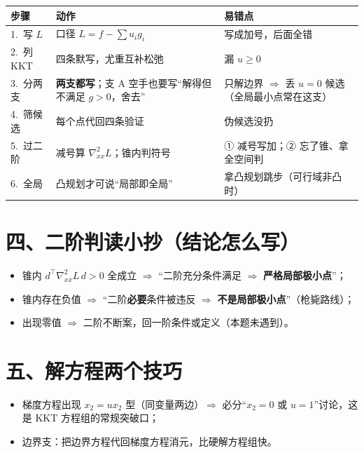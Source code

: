 \documentclass[11pt]{ctexart}
\begin{document}
\begin{center}\footnotesize
\begin{tabular}{p{2.6cm} p{6.4cm} p{6.6cm}}
\hline
\textbf{步骤} & \textbf{动作} & \textbf{易错点} \\
\hline
1.\ 写 $L$ & 口径 $L=f-\sum u_i g_i$ & 写成加号，后面全错 \\
2.\ 列 KKT & 四条默写，尤重互补松弛 & 漏 $u\ge0$ \\
3.\ 分两支 & \textbf{两支都写}；支 A 空手也要写``解得但不满足 $g>0$，舍去'' & 只解边界 $\Rightarrow$ 丢 $u=0$ 候选（全局最小点常在这支） \\
4.\ 筛候选 & 每个点代回四条验证 & 伪候选没扔 \\
5.\ 过二阶 & 减号算 $\nabla^2_{xx}L$；锥内判符号 & ① 减号写加；② 忘了锥、拿全空间判 \\
6.\ 全局 & 凸规划才可说``局部即全局'' & 拿凸规划跳步（可行域非凸时） \\
\hline
\end{tabular}
\end{center}

\section*{四、二阶判读小抄（结论怎么写）}

\begin{itemize}\setlength{\itemsep}{1pt}
\item 锥内 $d^\top\nabla^2_{xx}L\,d>0$ 全成立 $\Rightarrow$ ``二阶充分条件满足 $\Rightarrow$ \textbf{严格局部极小点}''；
\item 锥内存在负值 $\Rightarrow$ ``二阶\textbf{必要}条件被违反 $\Rightarrow$ \textbf{不是局部极小点}''（枪毙路线）；
\item 出现零值 $\Rightarrow$ 二阶不断案，回一阶条件或定义（本题未遇到）。
\end{itemize}

\section*{五、解方程两个技巧}

\begin{itemize}\setlength{\itemsep}{1pt}
\item 梯度方程出现 $x_2=u x_2$ 型（同变量两边）$\Rightarrow$ 必分``$x_2=0$ 或 $u=1$''讨论，这是 KKT 方程组的常规突破口；
\item 边界支：把边界方程代回梯度方程消元，比硬解方程组快。
\end{itemize}
\end{document}

